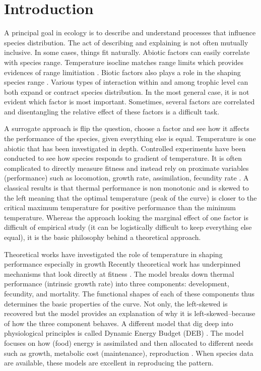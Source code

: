 \section*{Introduction}
A principal goal in ecology is to describe and understand processes that influence species distribution.
The act of describing and explaining is not often mutually inclusive.
In some cases, things fit naturally.
Abiotic factors can easily correlate with species range.
Temperature isocline matches range limits which provides evidences of range limitiation \citep{}.
Biotic factors also plays a role in the shaping species range \citep{}.
Various types of interaction within and among trophic level can both expand or contract species distribution.
In the most general case, it is not evident which factor is most important.
Sometimes, several factors are correlated and disentangling the relative effect of these  factors is a difficult task.

A surrogate approach is  flip the question, choose a factor and see how it affects the performance of the species, given everything else is equal.
Temperature is one abiotic that has been investigated in depth.
Controlled experiments have been conducted to see how species responds to gradient of temperature.
It is often complicated to directly measure fitness and instead rely on proximate variables (performance) such as locomotion, growth rate, assimilation, fecundity rate \citep[][and reference therein]{Angilletta2009}.
A classical results is that thermal performance is non monotonic and is skewed to the left meaning that the optimal temperature (peak of the curve) is closer to the critical maximum temperature for positive performance than the minimum temperature. 
Whereas the approach looking the marginal effect of one factor is difficult of empirical study (it can be logistically difficult to keep everything else equal), it is the basic philosophy behind a theoretical approach.

Theoretical works have investigated the role of temperature in shaping performance especially in growth \citep{} %
Recently theoretical work has underpinned mechanisms that look directly at fitness \citep{Amarasekare2012}.
The model  breaks down thermal performance (intrinsic growth rate)  into three components: development, fecundity, and mortality.
The functional shapes of each of these components thus determines the basic properties of the curve.
Not only, the left-skewed is recovered but the model provides an explanation of why it is left-skewed--because of how the three component behaves. 
A different model that dig deep into physiological principles is called Dynamic Energy Budget (DEB) \citep{Kooijman2009}.
The model focuses on how (food) energy is assimilated and then allocated to different needs such as growth, metabolic cost (maintenance), reproduction \citep{Kooijman2009}.
When species data are available, these models are excellent in reproducing the pattern. 

